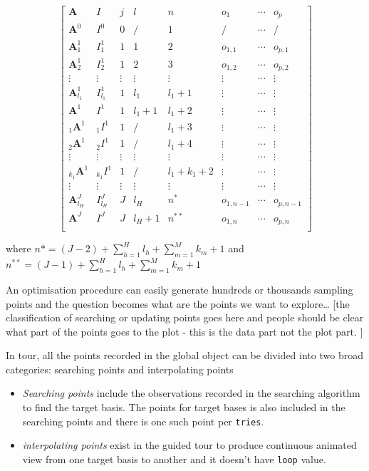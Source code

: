 \documentclass[12pt]{article}
\begin{document}
\begin{equation}
\left[
\begin{array}{cccccccc}
\mathbf{A} & I & j & l & n & o_1 & \cdots &o_p\\
\hline
\mathbf{A}^0 & I^0 & 0 & / & 1 & / & \cdots & /\\
\mathbf{A}^1_1 & I^1_1 & 1 & 1 & 2 & o_{1, 1} & \cdots & o_{p, 1}\\
\mathbf{A}^1_2 & I^1_2 & 1 & 2 & 3 & o_{1, 2} & \cdots & o_{p, 2}\\
\vdots &\vdots & \vdots &\vdots &\vdots &\vdots &\cdots &\vdots\\
\mathbf{A}^1_{l_1} & I^1_{l_1} & 1 & l_1 & l_1+1 & \vdots & \cdots & \vdots\\
\mathbf{A}^1 & I^1 & 1 & l_1 + 1 & l_1 + 2 & \vdots & \cdots & \vdots\\
{}_{1}\mathbf{A}^1 &{}_{1}I^1 & 1 & / & l_1 + 3 &\vdots & \cdots & \vdots\\
{}_{2}\mathbf{A}^1 &{}_{2}I^1 & 1 & / & l_1 + 4&\vdots & \cdots & \vdots\\
\vdots &\vdots &\vdots  &\vdots &\vdots &\vdots &\cdots &\vdots \\
{}_{k_1}\mathbf{A}^1 &{}_{k_1}I^1 & 1 & / & l_1 +k_1 + 2 &\vdots & \cdots & \vdots\\
\vdots &\vdots &\vdots  &\vdots &\vdots &\vdots &\cdots &\vdots \\
\mathbf{A}^J_{l_H} & I^J_{l_H} & J & l_H & n^{*} &o_{1, n-1}& \cdots & o_{p, n-1}\\
\mathbf{A}^J & I^J & J & l_H + 1 & n^{**} & o_{1, n}& \cdots & o_{p, n}\\
\end{array}
\right]
\label{eq:data-structure}
\end{equation}

where \(n* = (J-2) + \sum_{h = 1}^H l_h + \sum_{m = 1}^M k_m + 1\) and
\(n^{**} = (J-1) + \sum_{h = 1}^H l_h + \sum_{m = 1}^M k_m + 1\)

An optimisation procedure can easily generate hundreds or thousands
sampling points and the question becomes what are the points we want to
explore\ldots{} {[}the classification of searching or updating points
goes here and people should be clear what part of the points goes to the
plot - this is the data part not the plot part. {]}

In tour, all the points recorded in the global object can be divided
into two broad categories: searching points and interpolating points

\begin{itemize}
\item
  \emph{Searching points} include the observations recorded in the
  searching algorithm to find the target basis. The points for target
  bases is also included in the searching points and there is one such
  point per \texttt{tries}.
\item
  \emph{interpolating points} exist in the guided tour to produce
  continuous animated view from one target basis to another and it
  doesn't have \texttt{loop} value.
\end{itemize}
\end{document}
